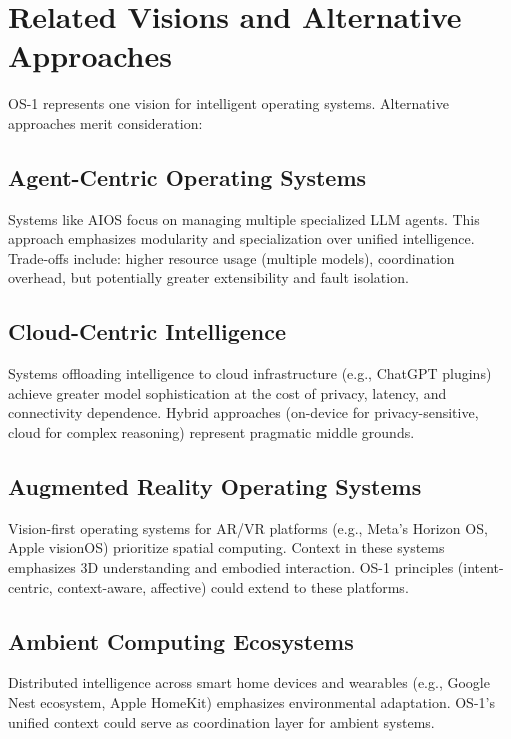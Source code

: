 \documentclass[conference]{IEEEtran}
\begin{document}
\section{Related Visions and Alternative Approaches}

OS-1 represents one vision for intelligent operating systems. Alternative approaches merit consideration:

\subsection{Agent-Centric Operating Systems}

Systems like AIOS \cite{mei2024aios} focus on managing multiple specialized LLM agents. This approach emphasizes modularity and specialization over unified intelligence. Trade-offs include: higher resource usage (multiple models), coordination overhead, but potentially greater extensibility and fault isolation.

\subsection{Cloud-Centric Intelligence}

Systems offloading intelligence to cloud infrastructure (e.g., ChatGPT plugins) achieve greater model sophistication at the cost of privacy, latency, and connectivity dependence. Hybrid approaches (on-device for privacy-sensitive, cloud for complex reasoning) represent pragmatic middle grounds.

\subsection{Augmented Reality Operating Systems}

Vision-first operating systems for AR/VR platforms (e.g., Meta's Horizon OS, Apple visionOS) prioritize spatial computing. Context in these systems emphasizes 3D understanding and embodied interaction. OS-1 principles (intent-centric, context-aware, affective) could extend to these platforms.

\subsection{Ambient Computing Ecosystems}

Distributed intelligence across smart home devices and wearables (e.g., Google Nest ecosystem, Apple HomeKit) emphasizes environmental adaptation. OS-1's unified context could serve as coordination layer for ambient systems.
\end{document}
